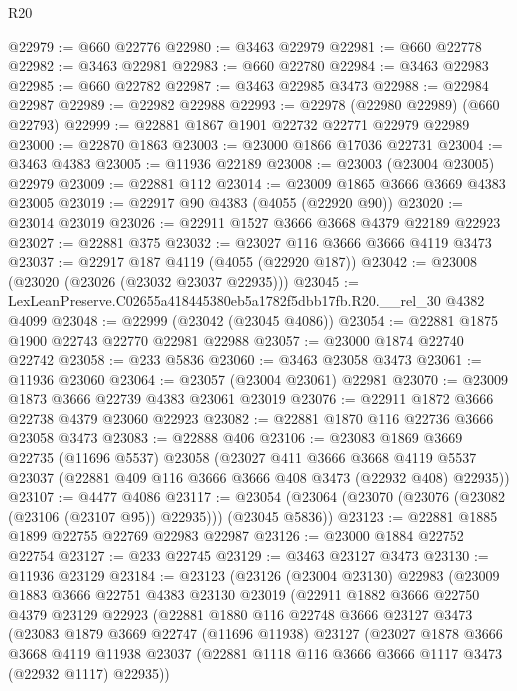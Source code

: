 \begin{lexlean}{R20}
\begin{coremodule}
@22979 := @660 @22776
@22980 := @3463 @22979
@22981 := @660 @22778
@22982 := @3463 @22981
@22983 := @660 @22780
@22984 := @3463 @22983
@22985 := @660 @22782
@22987 := @3463 @22985 @3473
@22988 := @22984 @22987
@22989 := @22982 @22988
@22993 := @22978 (@22980 @22989) (@660 @22793)
@22999 := @22881 @1867 @1901 @22732 @22771 @22979 @22989
@23000 := @22870 @1863
@23003 := @23000 @1866 @17036 @22731
@23004 := @3463 @4383
@23005 := @11936 @22189
@23008 := @23003 (@23004 @23005) @22979
@23009 := @22881 @112
@23014 := @23009 @1865 @3666 @3669 @4383 @23005
@23019 := @22917 @90 @4383 (@4055 (@22920 @90))
@23020 := @23014 @23019
@23026 := @22911 @1527 @3666 @3668 @4379 @22189 @22923
@23027 := @22881 @375
@23032 := @23027 @116 @3666 @3666 @4119 @3473
@23037 := @22917 @187 @4119 (@4055 (@22920 @187))
@23042 := @23008 (@23020 (@23026 (@23032 @23037 @22935)))
@23045 := LexLeanPreserve.C02655a418445380eb5a1782f5dbb17fb.R20.__rel_30 @4382 @4099
@23048 := @22999 (@23042 (@23045 @4086))
@23054 := @22881 @1875 @1900 @22743 @22770 @22981 @22988
@23057 := @23000 @1874 @22740 @22742
@23058 := @233 @5836
@23060 := @3463 @23058 @3473
@23061 := @11936 @23060
@23064 := @23057 (@23004 @23061) @22981
@23070 := @23009 @1873 @3666 @22739 @4383 @23061 @23019
@23076 := @22911 @1872 @3666 @22738 @4379 @23060 @22923
@23082 := @22881 @1870 @116 @22736 @3666 @23058 @3473
@23083 := @22888 @406
@23106 := @23083
    @1869
    @3669
    @22735
    (@11696 @5537)
    @23058
    (@23027
      @411
      @3666
      @3668
      @4119
      @5537
      @23037
      (@22881 @409 @116 @3666 @3666 @408 @3473 (@22932 @408) @22935))
@23107 := @4477 @4086
@23117 := @23054 (@23064 (@23070 (@23076 (@23082 (@23106 (@23107 @95)) @22935))) (@23045 @5836))
@23123 := @22881 @1885 @1899 @22755 @22769 @22983 @22987
@23126 := @23000 @1884 @22752 @22754
@23127 := @233 @22745
@23129 := @3463 @23127 @3473
@23130 := @11936 @23129
@23184 := @23123
    (@23126
      (@23004 @23130)
      @22983
      (@23009
        @1883
        @3666
        @22751
        @4383
        @23130
        @23019
        (@22911
          @1882
          @3666
          @22750
          @4379
          @23129
          @22923
          (@22881
            @1880
            @116
            @22748
            @3666
            @23127
            @3473
            (@23083
              @1879
              @3669
              @22747
              (@11696 @11938)
              @23127
              (@23027
                @1878
                @3666
                @3668
                @4119
                @11938
                @23037
                (@22881 @1118 @116 @3666 @3666 @1117 @3473 (@22932 @1117) @22935))

\end{coremodule}
\end{lexlean}

